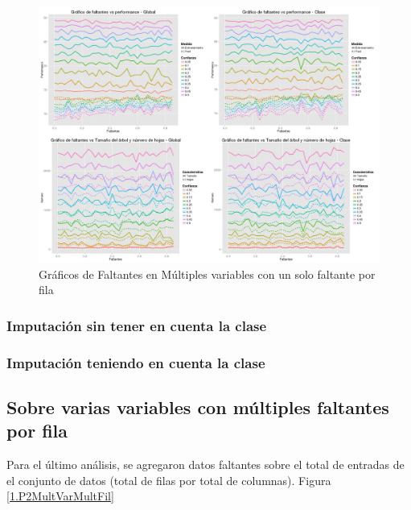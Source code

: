 \documentclass[]{article}
\begin{document}
\begin{figure}[H]
	\includegraphics[scale = 0.27]{2_1_Mult_Col_Unic_Fil}
	\caption[Faltantes Múltiple variable]{Gráficos de Faltantes en Múltiples variables con un solo faltante por fila}
	\label{2.P2MultVarUnicFil}
\end{figure}

\subsubsection{Imputación sin tener en cuenta la clase}

\subsubsection{Imputación teniendo en cuenta la clase}

\subsection{Sobre varias variables con múltiples faltantes por fila}
Para el último análisis, se agregaron datos faltantes sobre el total de entradas de el conjunto de datos (total de filas por total de columnas). Figura \ref{1.P2MultVarMultFil}
\end{document}
